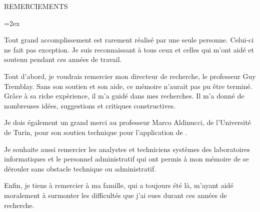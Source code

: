 
   \parskip=0pt
   \vspace*{0.1 truecm} 
   \begin{center}
    {\uppercase { REMERCIEMENTS }}\par
   \end{center}
   \nobreak \vspace*{1.10 truecm}
   \parskip=2ex




Tout grand accomplissement est rarement r\'ealis\'e par une seule personne. Celui-ci ne fait pas exception. Je suis reconnaissant \`a tous ceux et celles qui m'ont aid\'e et soutenu pendant ces ann\'ees de travail.

Tout d'abord, je voudrais remercier mon directeur de recherche, le professeur Guy Tremblay. Sans son soutien et son aide, ce m\'emoire n'aurait pas pu \^etre termin\'e. Gr\^ace \`a sa riche exp\`erience, il m'a guid\'e dans mes recherches. Il m'a donn\'e de nombreuses id\'ees, suggestions et critiques constructives.

Je dois \'egalement un grand merci au professeur Marco Aldinucci, de l'Universit\'e de Turin, pour son soutien technique pour l'application de . 

Je souhaite aussi remercier les analystes et techniciens syst\`emes des laboratoires informatiques et le personnel administratif qui ont permis \`a mon m\'emoire de se d\'erouler sans obstacle technique ou administratif.

Enfin, je tiens \`a remercier \`a ma famille, qui a toujours \'et\'e l\`a, m'ayant aid\'e moralement \`a surmonter les difficult\'es que j'ai eues durant ces ann\'ees de recherche. 


